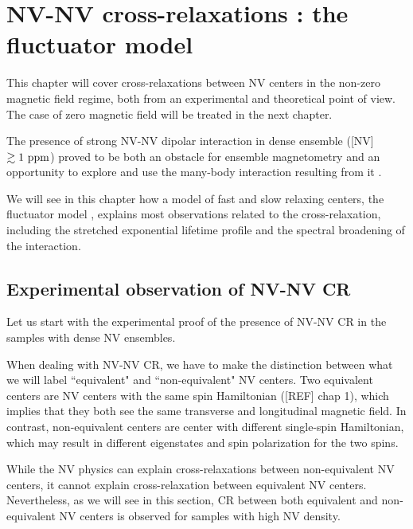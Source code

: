 \documentclass[a4paper, 11pt]{book}
\begin{document}
\chapter{NV-NV cross-relaxations : the fluctuator model}
This chapter will cover cross-relaxations between NV centers in the non-zero magnetic field regime, both from an experimental and theoretical point of view. The case of zero magnetic field will be treated in the next chapter.

The presence of strong NV-NV dipolar interaction in dense ensemble ([NV] $\gtrsim 1\ \rm ppm$) proved to be both an obstacle for ensemble magnetometry \citep{zhou2020quantum} and an opportunity to explore and use the many-body interaction resulting from it \citep{zhou2020quantum, choi2017observation, kucsko2018critical, zu2021emergent}.

We will see in this chapter how a model of fast and slow relaxing centers, the fluctuator model \citep{choi2017depolarization}, explains most observations related to the cross-relaxation, including the stretched exponential lifetime profile and the spectral broadening of the interaction.

\section{Experimental observation of NV-NV CR}
Let us start with the experimental proof of the presence of NV-NV CR in the samples with dense NV ensembles.

When dealing with NV-NV CR, we have to make the distinction between what we will label ``equivalent" and ``non-equivalent" NV centers. Two equivalent centers are NV centers with the same spin Hamiltonian ([REF] chap 1), which implies that they both see the same transverse and longitudinal magnetic field. In contrast, non-equivalent centers are center with different single-spin Hamiltonian, which may result in different eigenstates and spin polarization for the two spins.

While the NV physics can explain cross-relaxations between non-equivalent NV centers, it cannot explain cross-relaxation between equivalent NV centers. Nevertheless, as we will see in this section, CR between both equivalent and non-equivalent NV centers is observed for samples with high NV density. 
\end{document}

